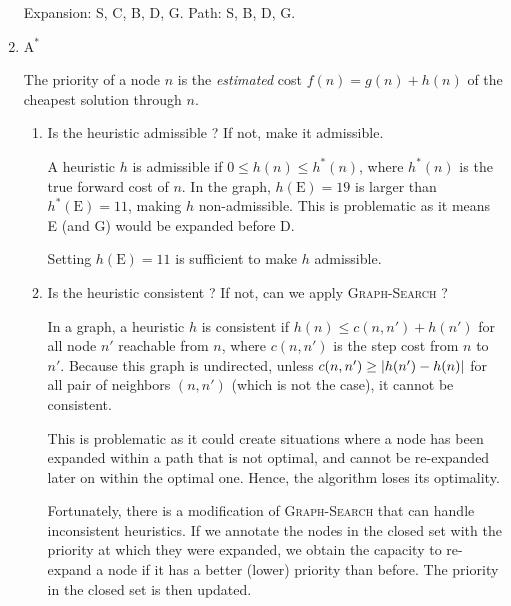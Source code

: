 \documentclass[11pt, a4paper]{article}
\def\Astar{$\text{A}^*$}
\begin{document}
\begin{enumerate}
\begin{solution}
        Expansion: S, C, B, D, G. Path: S, B, D, G.
    \end{solution}
    
    \item \Astar{}
    
    \begin{solution}
    The priority of a node $n$ is the \emph{estimated} cost $f(n) = g(n) + h(n)$ of the cheapest solution through $n$.
    \end{solution}
    
    \begin{enumerate}
        \item Is the heuristic admissible ? If not, make it admissible.
        
        \begin{solution}
            A heuristic $h$ is admissible if $0 \leq h(n) \leq h^*(n)$, where $h^*(n)$ is the true forward cost of $n$. In the graph, $h(\text{E}) = 19$ is larger than $h^*(\text{E}) = 11$, making $h$ non-admissible. This is problematic as it means E (and G) would be expanded before D.
        
            Setting $h(\text{E}) = 11$ is sufficient to make $h$ admissible.
        \end{solution}
        
        \item Is the heuristic consistent ? If not, can we apply \textsc{Graph-Search} ?
        
        \begin{solution}
            In a graph, a heuristic $h$ is consistent if $h(n) \leq c(n, n') + h(n')$ for all node $n'$ reachable from $n$, where $c(n, n')$ is the step cost from $n$ to $n'$. Because this graph is undirected, unless $c(n, n') \geq \lvert h(n') - h(n)\rvert$ for all pair of neighbors $(n, n')$ (which is not the case), it cannot be consistent.
            
            This is problematic as it could create situations where a node has been expanded within a path that is not optimal, and cannot be re-expanded later on within the optimal one. Hence, the algorithm loses its optimality.
            
            Fortunately, there is a modification of \textsc{Graph-Search} that can handle inconsistent heuristics. If we annotate the nodes in the closed set with the priority at which they were expanded, we obtain the capacity to re-expand a node if it has a better (lower) priority than before. The priority in the closed set is then updated.
        \end{solution}
    \end{enumerate}
    

\end{enumerate}
\end{document}
